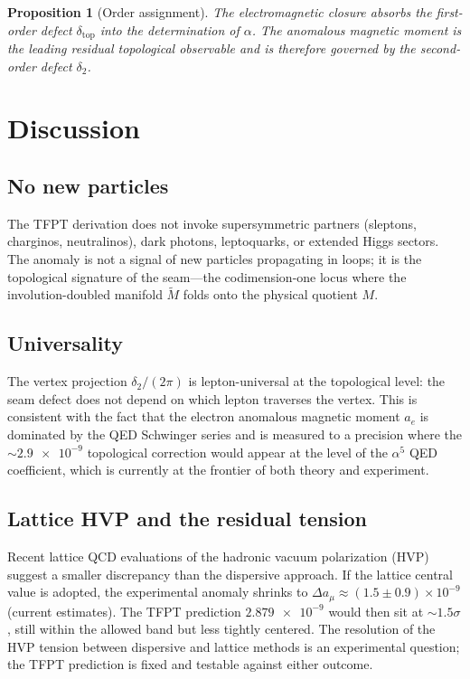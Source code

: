 \documentclass[11pt,a4paper]{article}
\newtheorem{proposition}[theorem]{Proposition}
\theoremstyle{definition}
\theoremstyle{remark}
\newcommand{\deltatop}{\delta_{\mathrm{top}}}
\numberwithin{equation}{section}
\begin{document}
\begin{proposition}[Order assignment]
\label{prop:order-assignment}
The electromagnetic closure absorbs the first-order defect $\deltatop$ into
the determination of $\alpha$. The anomalous magnetic moment is the
leading residual topological observable and is therefore governed by the
second-order defect $\delta_2$.
\end{proposition}


\section{Discussion}\label{sec:discussion}

\subsection{No new particles}

The TFPT derivation does not invoke supersymmetric partners (sleptons,
charginos, neutralinos), dark photons, leptoquarks, or extended Higgs
sectors. The anomaly is not a signal of new particles propagating in
loops; it is the topological signature of the seam---the codimension-one
locus where the involution-doubled manifold $\widetilde M$ folds onto
the physical quotient $M$.

\subsection{Universality}

The vertex projection $\delta_2/(2\pi)$ is lepton-universal at the topological
level: the seam defect does not depend on which lepton traverses the vertex.
This is consistent with the fact that the electron anomalous magnetic
moment $a_e$ is dominated by the QED Schwinger series and is measured to a
precision where the $\sim\!\num{2.9e-9}$ topological correction would appear
at the level of the $\alpha^5$ QED coefficient, which is currently at the
frontier of both theory and experiment.

\subsection{Lattice HVP and the residual tension}

Recent lattice QCD evaluations of the hadronic vacuum polarization
(HVP)~\cite{BMW2021,RBC2024} suggest a smaller discrepancy than the
dispersive approach. If the lattice central value is adopted, the
experimental anomaly shrinks to $\Delta a_\mu\approx(1.5\pm0.9)\times10^{-9}$
(current estimates). The TFPT prediction $\num{2.879e-9}$ would then sit
at $\sim\!1.5\sigma$, still within the allowed band but less tightly centered.
The resolution of the HVP tension between dispersive and lattice methods is
an experimental question; the TFPT prediction is fixed and testable against
either outcome.
\end{document}

